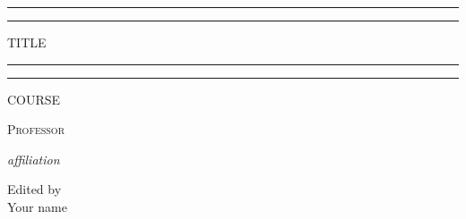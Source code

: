 \documentclass[a4paper,oneside]{book}
\begin{document}
	\begin{titlepage} %
		
		\centering %
		
		\scshape %
		
		\vspace*{\baselineskip} %
		
		
		\rule{\textwidth}{1.6pt}\vspace*{-\baselineskip}\vspace*{2pt} %
		\rule{\textwidth}{0.4pt} %
		
		\vspace{0.75\baselineskip} %
		
		{\huge TITLE\\} %
		
		\vspace{0.75\baselineskip} %
		
		\rule{\textwidth}{0.4pt}\vspace*{-\baselineskip}\vspace{3.2pt} %
		\rule{\textwidth}{1.6pt} %
		
		\vspace{2\baselineskip} %
		
		
		\LARGE{COURSE} 
		
		\vspace*{3\baselineskip} %
		
		
		
		\vspace{0.5\baselineskip} 
		
		{\scshape   \LARGE Professor\\ } %
		
		\vspace{0.5\baselineskip} 
		
		\textit{\Large affiliation} %
		
		\vfill 
		
		
		
		\vspace{0.3\baselineskip} 
		
		
		{\large Edited by\\  Your name} 
		
	\end{titlepage}
	\tableofcontents
\end{document}
